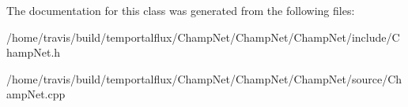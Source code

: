 The documentation for this class was generated from the following files\-:\begin{DoxyCompactItemize}
\item 
/home/travis/build/temportalflux/\-Champ\-Net/\-Champ\-Net/\-Champ\-Net/include/Champ\-Net.\-h\item 
/home/travis/build/temportalflux/\-Champ\-Net/\-Champ\-Net/\-Champ\-Net/source/Champ\-Net.\-cpp\end{DoxyCompactItemize}
